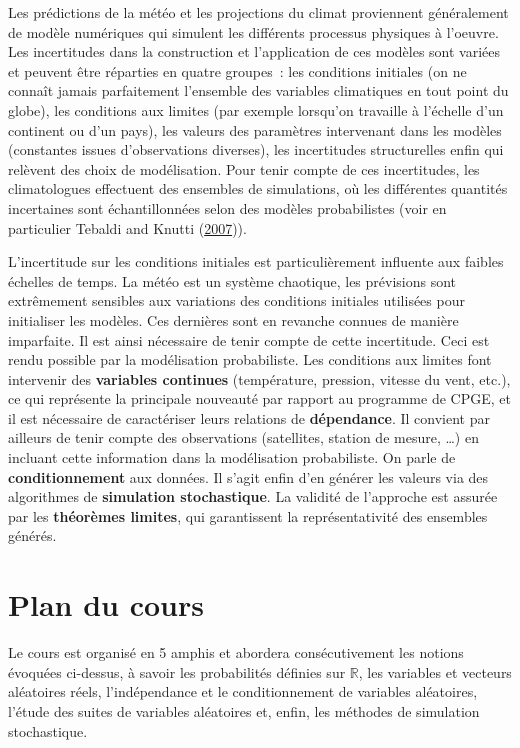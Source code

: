Les prédictions de la météo et les projections du climat proviennent
généralement de modèle numériques qui simulent les différents processus
physiques à l'oeuvre. Les incertitudes dans la construction et
l'application de ces modèles sont variées et peuvent être réparties en
quatre groupes~: les conditions initiales (on ne connaît jamais
parfaitement l'ensemble des variables climatiques en tout point du
globe), les conditions aux limites (par exemple lorsqu'on travaille à
l'échelle d'un continent ou d'un pays), les valeurs des paramètres
intervenant dans les modèles (constantes issues d'observations
diverses), les incertitudes structurelles enfin qui relèvent des choix
de modélisation. Pour tenir compte de ces incertitudes, les
climatologues effectuent des ensembles de simulations, où les
différentes quantités incertaines sont échantillonnées selon des modèles
probabilistes (voir en particulier Tebaldi and Knutti
(\protect\hyperlink{refI-tebaldi}{2007})).

L'incertitude sur les conditions initiales est particulièrement
influente aux faibles échelles de temps. La météo est un système
chaotique, les prévisions sont extrêmement sensibles aux variations des
conditions initiales utilisées pour initialiser les modèles. Ces
dernières sont en revanche connues de manière imparfaite. Il est ainsi
nécessaire de tenir compte de cette incertitude. Ceci est rendu possible
par la modélisation probabiliste. Les conditions aux limites font
intervenir des \textbf{variables continues} (température, pression,
vitesse du vent, etc.), ce qui représente la principale nouveauté par
rapport au programme de CPGE, et il est nécessaire de caractériser leurs
relations de \textbf{dépendance}. Il convient par ailleurs de tenir
compte des observations (satellites, station de mesure, \ldots) en
incluant cette information dans la modélisation probabiliste. On parle
de \textbf{conditionnement} aux données. Il s'agit enfin d'en générer
les valeurs via des algorithmes de \textbf{simulation stochastique}. La
validité de l'approche est assurée par les \textbf{théorèmes limites},
qui garantissent la représentativité des ensembles générés.

\section{Plan du cours}\label{I-plan-du-cours}

Le cours est organisé en 5 amphis et abordera consécutivement les
notions évoquées ci-dessus, à savoir les probabilités définies sur
\(\mathbb{R}\), les variables et vecteurs aléatoires réels,
l'indépendance et le conditionnement de variables aléatoires, l'étude
des suites de variables aléatoires et, enfin, les méthodes de simulation
stochastique.

